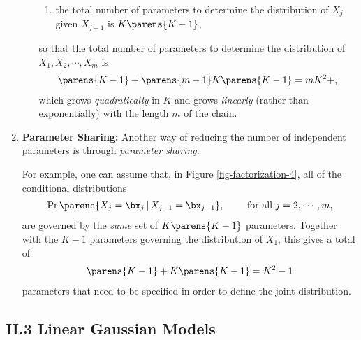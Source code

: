 \documentclass[12pt]{article}
\begin{document}
\begin{enumerate}[label=\textbf{\arabic*.}]
\begin{enumerate}
\begin{enumerate}
		\item the total number of parameters to determine the distribution of $X_j$ given $X_{j-1}$ is $K \parens{K-1}$, 
	\end{enumerate}
	so that the total number of parameters to determine the distribution of $X_1, X_2, \cdots, X_m$ is 
	\begin{align*}
		\parens{K - 1} + \parens{m - 1} K \parens{K-1} = m K^2 + , 
	\end{align*}
	which grows \emph{quadratically} in $K$ and grows \emph{linearly} (rather than exponentially) with the length $m$ of the chain. 
	\end{enumerate}
	
	\item \textbf{Parameter Sharing:} Another way of reducing the number of independent parameters is through \emph{parameter sharing}. 
	
	For example, one can assume that, in Figure \ref{fig-factorization-4}, all of the conditional distributions 
	\begin{align*}
		\Pr \parens{X_{j} = \bx_j \,\vert\, X_{j-1} = \bx_{j-1}}, \qquad \text{ for all } j = 2, \cdots, m, 
	\end{align*}
	are governed by the \emph{same} set of $K \parens{K-1}$ parameters. Together with the $K-1$ parameters governing the distribution of $X_1$, this gives a total of 
	\begin{align*}
		\parens{K-1} + K \parens{K-1} = K^2-1
	\end{align*}
	parameters that need to be specified in order to define the joint distribution. 

\end{enumerate}


\subsection*{II.3 Linear Gaussian Models}
\end{document}
